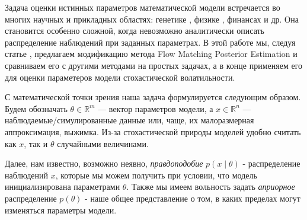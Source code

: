 Задача оценки истинных параметров математической модели встречается во многих научных и прикладных областях: 
    генетике \cite{abcinpopulationgenetics}, физике \cite{dax2023flowmatchingscalablesimulationbased}, финансах и др. 
    Она становится особенно сложной, когда невозможно аналитически описать распределение наблюдений 
    при заданных параметрах. В этой работе мы, следуя статье \cite{dax2023flowmatchingscalablesimulationbased}, 
    предлагаем модификацию метода Flow Matching Posterior Estimation и сравниваем его с другими методами на простых задачах, 
    а в конце применяем его для оценки параметеров модели стохастической волатильности.





    С математической точки зрения наша задача формулируется следующим образом. 
    Будем обозначать $\theta \in \mathbb{R}^m$ --- вектор параметров модели, а $x \in \mathbb{R}^n$ --- наблюдаемые/симулированные данные
    или, чаще, их малоразмерная аппроксимация, выжимка. Из-за стохастической природы моделей удобно считать как $x$, 
    так и $\theta$ случайными величинами. 
    
    Далее, нам известно, возможно неявно, \textit{правдоподобие} $p(x \mid \theta)$ - распределение наблюдений $x$, которые мы можем получить при условии, 
    что модель инициализирована параметрами $\theta$. Также мы имеем вольность задать \textit{априорное} распределение $p(\theta)$ 
    - наше общее представление о том, в каких пределах могут изменяться параметры модели. 

